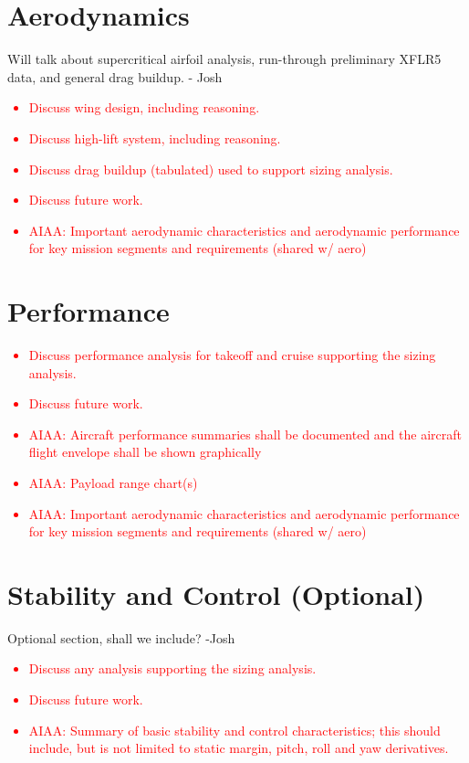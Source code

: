 \documentclass[conf]{new-aiaa}
\begin{document}
\section{Aerodynamics}


Will talk about supercritical airfoil analysis, run-through preliminary XFLR5 data, and general drag buildup. - Josh
\textcolor{red}{
\begin{itemize}
    \item Discuss wing design, including reasoning.
    \item Discuss high-lift system, including reasoning.
    \item Discuss drag buildup (tabulated) used to support sizing analysis.
    \item Discuss future work.
    \item AIAA: Important aerodynamic characteristics and aerodynamic performance for key mission
    segments and requirements (shared w/ aero)
\end{itemize}}

\section{Performance}
\textcolor{red}{
\begin{itemize}
    \item Discuss performance analysis for takeoff and cruise supporting the sizing analysis.
    \item Discuss future work.
    \item AIAA: Aircraft performance summaries shall be documented and the aircraft flight envelope
    shall be shown graphically
    \item AIAA: Payload range chart(s)
    \item AIAA: Important aerodynamic characteristics and aerodynamic performance for key mission
    segments and requirements (shared w/ aero)
\end{itemize}}

\section{Stability and Control (Optional)}
Optional section, shall we include? -Josh
\textcolor{red}{
\begin{itemize}
    \item Discuss any analysis supporting the sizing analysis.
    \item Discuss future work.
    \item AIAA: Summary of basic stability and control characteristics; this should include, but is not
    limited to static margin, pitch, roll and yaw derivatives.
\end{itemize}}
\end{document}
